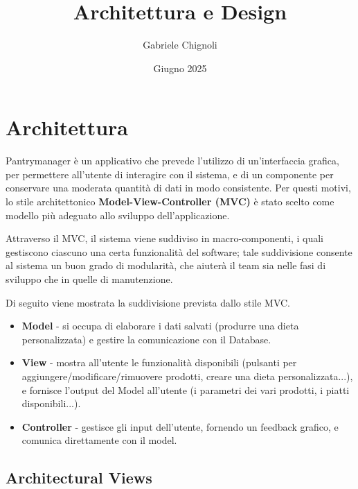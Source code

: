 \documentclass{article}
\title{\huge Architettura e Design}
\author{Gabriele Chignoli}
\date{Giugno 2025}
\begin{document}
\maketitle
\newpage
\tableofcontents
\newpage

\section{Architettura}
Pantrymanager è un applicativo che prevede l'utilizzo di un'interfaccia grafica, per permettere all'utente di interagire con il sistema, e di un componente per conservare una moderata quantità di dati in modo consistente. Per questi motivi, lo stile architettonico \textbf{Model-View-Controller (MVC)} è stato scelto come modello più adeguato allo sviluppo dell'applicazione. 

Attraverso il MVC, il sistema viene suddiviso in macro-componenti, i quali gestiscono ciascuno una certa funzionalità del software; tale suddivisione consente al sistema un buon grado di modularità, che aiuterà il team sia nelle fasi di sviluppo che in quelle di manutenzione. \newline 

Di seguito viene mostrata la suddivisione prevista dallo stile MVC.  

\begin{itemize}
    \item \textbf{Model} - si occupa di elaborare i dati salvati (produrre una dieta personalizzata) e gestire la comunicazione con il Database.  
    \item \textbf{View} - mostra all'utente le funzionalità disponibili (pulsanti per aggiungere/modificare/rimuovere prodotti, creare una dieta personalizzata...), e fornisce l'output del Model all'utente (i parametri dei vari prodotti, i piatti disponibili...). 
    \item \textbf{Controller} - gestisce gli input dell'utente, fornendo un feedback grafico, e comunica direttamente con il model. 
\end{itemize}

\subsection{Architectural Views}
\end{document}
